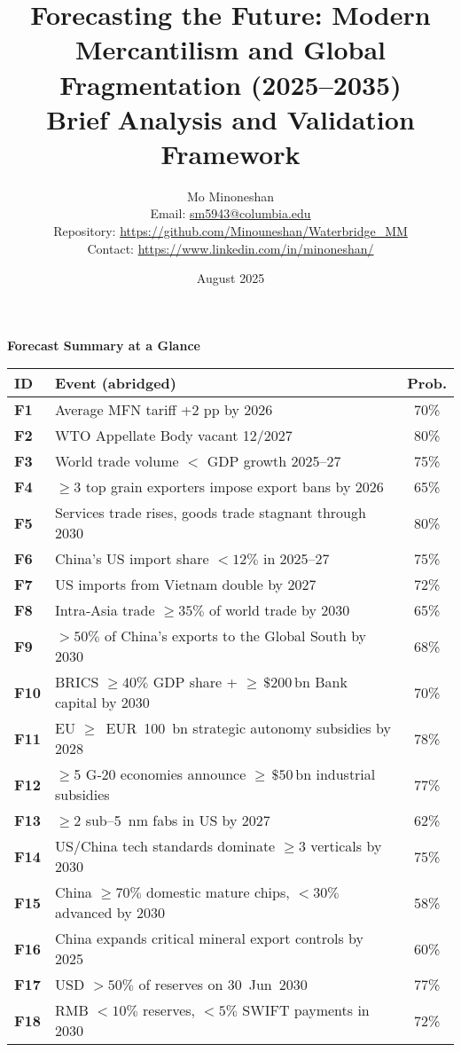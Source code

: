 \documentclass{article}
\title{\textbf{Forecasting the Future: Modern Mercantilism and Global Fragmentation (2025--2035)}\\\Large Brief Analysis and Validation Framework}
\author{Mo Minoneshan\\
\small Email: \href{mailto:sm5943@columbia.edu}{sm5943@columbia.edu}\\
\small Repository: \url{https://github.com/Minouneshan/Waterbridge\_MM}\\
\small Contact: \url{https://www.linkedin.com/in/minoneshan/}}
\date{August 2025}
\newenvironment{landscapetable}{\begin{landscape}\small}{\end{landscape}}
\begin{document}
\maketitle

\tableofcontents


\begin{landscapetable}
\captionsetup{type=table}
\caption*{\bfseries Forecast Summary at a Glance}
\begin{tabularx}{\textwidth}{>{\bfseries}lXc}
\toprule
ID & Event (abridged) & Prob.\\
\midrule
F1 & Average MFN tariff +2 pp by 2026 & 70\%\\
F2 & WTO Appellate Body vacant 12/2027 & 80\%\\
F3 & World trade volume $<$ GDP growth 2025–27 & 75\%\\
F4 & $\geq$3 top grain exporters impose export bans by 2026 & 65\%\\
F5 & Services trade rises, goods trade stagnant through 2030 & 80\%\\
F6 & China’s US import share $<12\%$ in 2025–27 & 75\%\\
F7 & US imports from Vietnam double by 2027 & 72\%\\
F8 & Intra‑Asia trade $\geq 35\%$ of world trade by 2030 & 65\%\\
F9 & $>50\%$ of China’s exports to the Global South by 2030 & 68\%\\
F10 & BRICS $\geq 40\%$ GDP share + $\geq\,\$200\,\mathrm{bn}$ Bank capital by 2030 & 70\%\\
F11 & EU $\geq$ EUR 100 bn strategic autonomy subsidies by 2028 & 78\%\\
F12 & $\geq$5 G‑20 economies announce $\geq\,\$50\,\mathrm{bn}$ industrial subsidies & 77\%\\
F13 & $\geq$2 sub–5 nm fabs in US by 2027 & 62\%\\
F14 & US/China tech standards dominate $\geq$3 verticals by 2030 & 75\%\\
F15 & China $\geq 70\%$ domestic mature chips, $<30\%$ advanced by 2030 & 58\%\\
F16 & China expands critical mineral export controls by 2025 & 60\%\\
F17 & USD $>50\%$ of reserves on 30 Jun 2030 & 77\%\\
F18 & RMB $<10\%$ reserves, $<5\%$ SWIFT payments in 2030 & 72\%\\

\end{tabularx}
\end{landscapetable}
\end{document}
